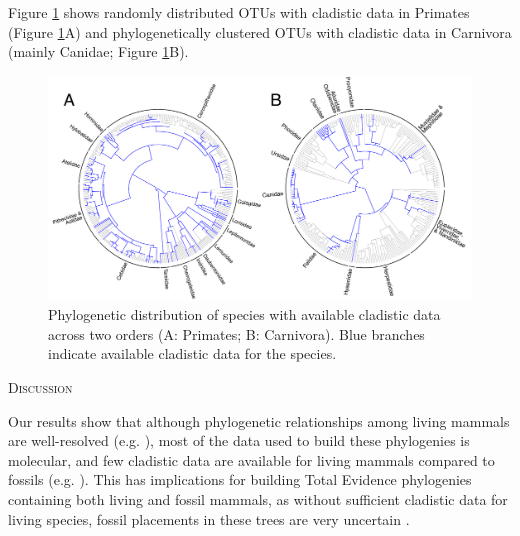 \documentclass[12pt,letterpaper]{article}
\renewcommand{\section}[1]{%
\bigskip
\begin{center}
\begin{Large}
\normalfont\scshape #1
\medskip
\end{Large}
\end{center}}
\begin{document}
Figure \ref{Figure_example_coverage} shows randomly distributed OTUs with cladistic data in Primates (Figure \ref{Figure_example_coverage}A) and phylogenetically clustered OTUs with cladistic data in Carnivora (mainly Canidae; Figure \ref{Figure_example_coverage}B).

\begin{figure}[!htbp]
\centering
    \includegraphics[width=1\textwidth]{example_coverage.pdf}
\caption{Phylogenetic distribution of species with available cladistic data across two orders (A: Primates; B: Carnivora).
Blue branches indicate available cladistic data for the species.}
\label{Figure_example_coverage}
\end{figure}

%
%

\section{Discussion}
Our results show that although phylogenetic relationships among living mammals are well-resolved (e.g. \cite{BinindaEmonds,meredithimpacts2011}), most of the data used to build these phylogenies is molecular, and few cladistic data are available for living mammals compared to fossils (e.g. \cite{O'Leary08022013,ni2013oldest}).
This has implications for building Total Evidence phylogenies containing both living and fossil mammals, as without sufficient cladistic data for living species, fossil placements in these trees are very uncertain \cite{GuillermeCooper}.
\end{document}

